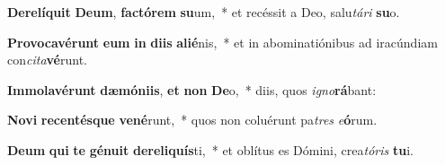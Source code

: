 \item \textbf{De}\textbf{re}\textbf{lí}\textbf{quit} \textbf{De}\textbf{um}, \textbf{fac}\textbf{tó}\textbf{rem} \textbf{su}um,~* et recéssit a Deo, salu\textit{tá}\textit{ri} \textbf{su}o.
\item \textbf{Pro}\textbf{vo}\textbf{ca}\textbf{vé}\textbf{runt} \textbf{e}\textbf{um} \textbf{in} \textbf{di}\textbf{is} \textbf{a}\textbf{li}\textbf{é}nis,~* et in abominatiónibus ad iracúndiam con\textit{ci}\textit{ta}\textbf{vé}runt.
\item \textbf{Im}\textbf{mo}\textbf{la}\textbf{vé}\textbf{runt} \textbf{dæ}\textbf{mó}\textbf{ni}\textbf{is}, \textbf{et} \textbf{non} \textbf{De}o,~* diis, quos \textit{i}\textit{gno}\textbf{rá}bant:
\item \textbf{No}\textbf{vi} \textbf{re}\textbf{cen}\textbf{tés}\textbf{que} \textbf{ve}\textbf{né}runt,~* quos non coluérunt pa\textit{tres} \textit{e}\textbf{ó}rum.
\item \textbf{De}\textbf{um} \textbf{qui} \textbf{te} \textbf{gé}\textbf{nu}\textbf{it} \textbf{de}\textbf{re}\textbf{li}\textbf{quís}ti,~* et oblítus es Dómini, crea\textit{tó}\textit{ris} \textbf{tu}i.
